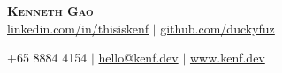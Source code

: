 \documentclass[letterpaper,11pt]{article}
\newcommand{\reduceSpace}[1]{
  \vspace{-#1}
}
\begin{document}

\begin{center}
    \textbf{\Huge \scshape Kenneth Gao} \\ \vspace{1pt}
    \href{https://linkedin.com/in/thisiskenf/}{{linkedin.com/in/thisiskenf}} $|$ \href{https://github.com/duckyfuz/}{{github.com/duckyfuz}}
    
    \small +65 8884 4154 $|$ \href{mailto:hello@kenf.dev}{{hello@kenf.dev}} $|$ \href{https://www.kenf.dev/}{{www.kenf.dev}}
    \reduceSpace{10pt}
\end{center}

\end{document}

